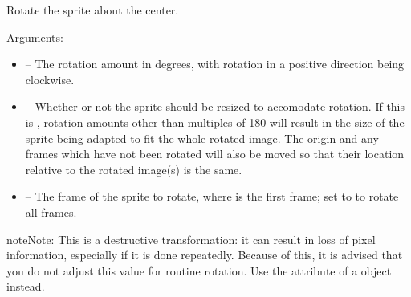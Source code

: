 \documentclass[letterpaper,10pt,english]{sphinxmanual}
\begin{document}
\begin{fulllineitems}
\label{gfx:sge.gfx.Sprite.rotate}
Rotate the sprite about the center.

Arguments:
\begin{itemize}
\item {} 
 -- The rotation amount in degrees, with rotation in a
positive direction being clockwise.

\item {} 
 -- Whether or not the sprite should be
resized to accomodate rotation.  If this is ,
rotation amounts other than multiples of 180 will result in
the size of the sprite being adapted to fit the whole rotated
image.  The origin and any frames which have not been rotated
will also be moved so that their location relative to the
rotated image(s) is the same.

\item {} 
 -- The frame of the sprite to rotate, where  is
the first frame; set to  to rotate all frames.

\end{itemize}

\begin{notice}{note}{Note:}
This is a destructive transformation: it can result in loss
of pixel information, especially if it is done repeatedly.
Because of this, it is advised that you do not adjust this
value for routine rotation.  Use the 
attribute of a {\hyperref[dsp:sge.dsp.Object]{\emph{}}} object instead.
\end{notice}

\end{fulllineitems}

\end{document}
